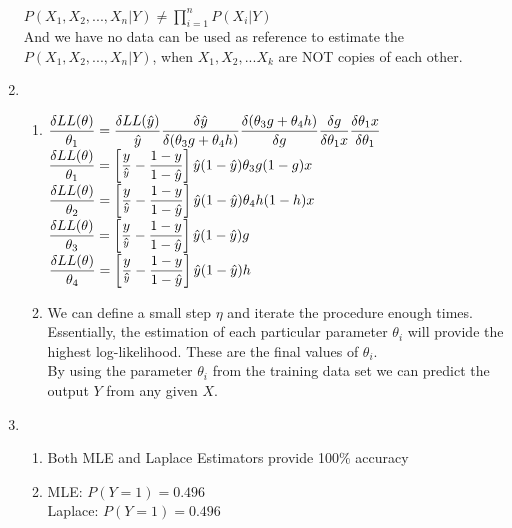 \documentclass{article}
\begin{document}
\begin{enumerate}
	$P(X_1, X_2,...,X_n|Y)\neq \prod\limits_{i = 1}^{n}P(X_i|Y)$\\
	And we have no data can be used as reference to estimate the $P(X_1, X_2,...,X_n|Y)$, when $X_1, X_2,...X_k$ are NOT copies of each other.
	\item
	\begin{enumerate}
		\item
		$\mathlarger{\frac{\delta LL(\theta)}{\theta_1}
			=\frac{\delta LL(\hat{y})}{\hat{y}}
			 \frac{\delta \hat{y}}{\delta(\theta_3 g + \theta_4 h)}
			 \frac{\delta(\theta_3 g + \theta_4 h)}{\delta g}
			 \frac{\delta g}{\delta\theta_1 x}
			 \frac{\delta \theta_1 x}{\delta \theta_1}
		 }$\\
	 	$\mathlarger{\frac{\delta LL(\theta)}{\theta_1}
	 		=\left[\frac{y}{\hat{^y}}-\frac{1-y}{1-\hat{y}}\right]
	 		\hat{y}(1-\hat{y})
	 		\theta_3
	 		g(1-g)
	 		x
 		}$\\
	 	$\mathlarger{\frac{\delta LL(\theta)}{\theta_2}
			=\left[\frac{y}{\hat{^y}}-\frac{1-y}{1-\hat{y}}\right]
			\hat{y}(1-\hat{y})
			\theta_4
			h(1-h)
			x
		}$\\ 	
	 	$\mathlarger{\frac{\delta LL(\theta)}{\theta_3}
			=\left[\frac{y}{\hat{^y}}-\frac{1-y}{1-\hat{y}}\right]
			\hat{y}(1-\hat{y})
			g
		}$\\
		$\mathlarger{\frac{\delta LL(\theta)}{\theta_4}
			=\left[\frac{y}{\hat{^y}}-\frac{1-y}{1-\hat{y}}\right]
			\hat{y}(1-\hat{y})
			h
		}$\\ 
		\item 
		We can define a small step $\eta$ and iterate the procedure enough times. Essentially, the estimation of each particular parameter $\theta_i$ will provide the highest log-likelihood. These are the final values of $\theta_i$.\\
		By using the parameter $\theta_i$ from the training data set we can predict the output $Y$ from any given $X$.
	\end{enumerate}
	\item
	\begin{enumerate}
		\item
		Both MLE and Laplace Estimators provide 100\% accuracy
		\item
		MLE: $P(Y = 1) = 0.496$\\
		Laplace: $P(Y = 1) = 0.496$\\


\end{enumerate}
\end{enumerate}
\end{document}
